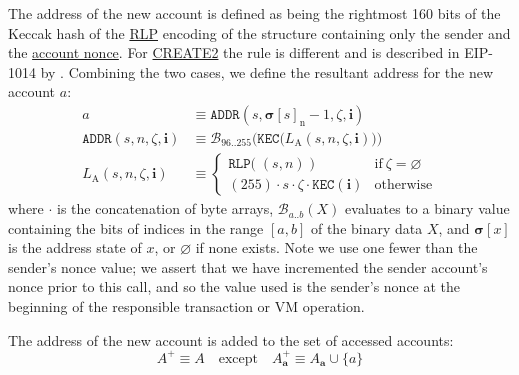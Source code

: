 \documentclass[9pt,oneside]{amsart}
\begin{document}
\begin{multicols}{2}
The address of the new account is defined as being the rightmost 160 bits of the Keccak hash of the \hyperlink{rlp}{RLP} encoding of the structure containing only the sender and the \hyperlink{account_nonce}{account nonce}.
For {\small \hyperlink{create2}{CREATE2}} the rule is different and is described in EIP-1014 by \cite{EIP-1014}.
Combining the two cases, we define the resultant address for the new account $a$:
\begin{align}
a & \equiv \mathtt{ADDR}(s, \boldsymbol{\sigma}[s]_{\mathrm{n}} - 1, \zeta, \mathbf{i}) \\
\label{eq:new-address} \mathtt{ADDR}(s, n, \zeta, \mathbf{i}) & \equiv \mathcal{B}_{96..255}\Big(\mathtt{KEC}\big( L_{\mathrm{A}}(s, n, \zeta, \mathbf{i})\big) \Big) \\
L_{\mathrm{A}}(s, n, \zeta, \mathbf{i}) & \equiv \begin{cases}
\mathtt{RLP}\big(\;(s, n)\;\big) & \text{if}\ \zeta = \varnothing \\
(255) \cdot s \cdot \zeta \cdot \mathtt{KEC}(\mathbf{i}) & \text{otherwise}
\end{cases}
\end{align}
where $\cdot$ is the concatenation of byte arrays, $\mathcal{B}_{a..b}(X)$ evaluates to a binary value containing the bits of indices in the range $[a, b]$ of the binary data $X$, and $\boldsymbol{\sigma}[x]$ is the address state of $x$, or $\varnothing$ if none exists. Note we use one fewer than the sender's nonce value; we assert that we have incremented the sender account's nonce prior to this call, and so the value used is the sender's nonce at the beginning of the responsible transaction or VM operation.

The address of the new account is added to the set of accessed accounts:
\begin{equation}
A^+ \equiv A \quad \text{except} \quad A^+_{\mathbf{a}} \equiv A_{\mathbf{a}} \cup \{a\}
\end{equation}


\end{multicols}
\end{document}
